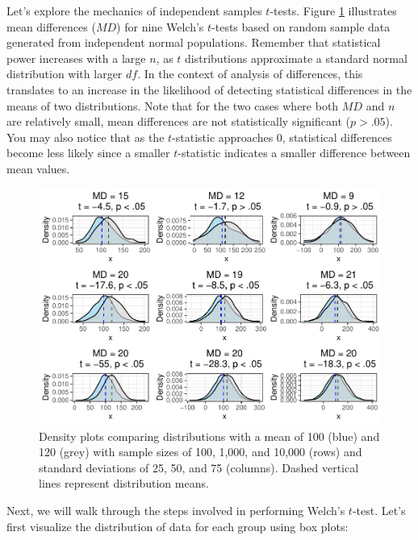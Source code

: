 \documentclass[
]{book}
\begin{document}
Let's explore the mechanics of independent samples \(t\)-tests. Figure \ref{fig:mean-group-diff} illustrates mean differences (\(MD\)) for nine Welch's \(t\)-tests based on random sample data generated from independent normal populations. Remember that statistical power increases with a large \(n\), as \(t\) distributions approximate a standard normal distribution with larger \(df\). In the context of analysis of differences, this translates to an increase in the likelihood of detecting statistical differences in the means of two distributions. Note that for the two cases where both \(MD\) and \(n\) are relatively small, mean differences are not statistically significant (\(p > .05\)). You may also notice that as the \(t\)-statistic approaches 0, statistical differences become less likely since a smaller \(t\)-statistic indicates a smaller difference between mean values.

\begin{figure}

{\centering \includegraphics[width=1\linewidth]{The_Fundamentals_of_People_Analytics_files/figure-latex/mean-group-diff-1} 

}

\caption{Density plots comparing distributions with a mean of 100 (blue) and 120 (grey) with sample sizes of 100, 1,000, and 10,000 (rows) and standard deviations of 25, 50, and 75 (columns). Dashed vertical lines represent distribution means.}\label{fig:mean-group-diff}
\end{figure}

Next, we will walk through the steps involved in performing Welch's \(t\)-test. Let's first visualize the distribution of data for each group using box plots:
\end{document}
